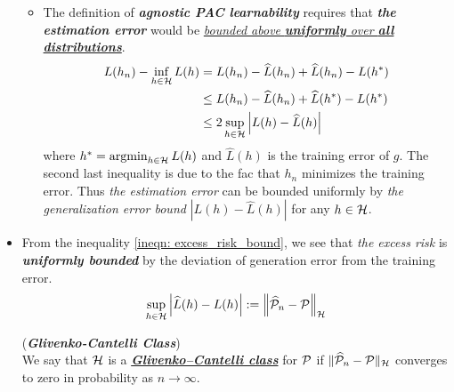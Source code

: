 \documentclass[11pt]{article}
\begin{document}
\begin{itemize}
\begin{remark}
\begin{itemize}
\item The definition of \emph{\textbf{agnostic PAC learnability}} requires that \emph{\textbf{the estimation error}} would be \underline{\emph{bounded above} \emph{\textbf{uniformly} over \textbf{all distributions}}}.
\begin{align}
L(h_n) - \inf_{h \in {\mathcal H}}L(h) &= L(h_n) - \widehat{L}(h_n) + \widehat{L}(h_n) - L(h^{*}) \nonumber\\
&\le  L(h_n) - \widehat{L}(h_n) +\widehat{L}(h^{*}) - L(h^{*}) \nonumber\\
&\le  2 \sup_{h\in {\mathcal H}}\left\lvert L(h) - \widehat{L}(h) \right\rvert \label{ineqn: excess_risk_bound}
\end{align} where $h^{*} = \operatorname{argmin}_{h\in {\mathcal H}}L(h)$ and $\widehat{L}(h)$ is the training error of $g$. The second last inequality is due to the fac that $h_n$ minimizes the training error.  Thus \emph{the estimation error} can be bounded uniformly by \emph{the generalization error bound} $|L(h) - \widehat{L}(h)|$ for any $h \in {\mathcal H}$.
\end{itemize}
\end{remark} 

\item \begin{remark}
From the inequality \eqref{ineqn: excess_risk_bound}, we see that \emph{the excess risk} is \emph{\textbf{uniformly bounded}} by the deviation of generation error from the training error.
\begin{align*}
\sup_{h\in {\mathcal H}}\left\lvert \widehat{L}(h) - L(h) \right\rvert := \left\|\widehat{{\mathcal P}}_n - {\mathcal P}\right\|_{{\mathcal H}}
\end{align*}
\begin{definition} (\textbf{\emph{Glivenko-Cantelli Class}}) \citep{wainwright2019high, gine2021mathematical}\\
We say that ${\mathcal H}$ is a \underline{\textit{\textbf{Glivenko–Cantelli class}}} for ${\mathcal P}$ if $\|\widehat{{\mathcal P}}_n - {\mathcal P}\|_{{\mathcal H}}$ converges to zero in probability as $n \to \infty$.
\end{definition}
\end{remark}

\end{itemize}
\end{document}
